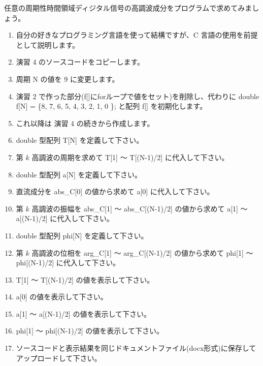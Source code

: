 \documentclass[a4paper]{jarticle}
\begin{document}
 任意の周期性時間領域ディジタル信号の高調波成分をプログラムで求めてみましょう。 \par
\par\vspace{1zh}
\begin{enumerate}
\item 自分の好きなプログラミング言語を使って結構ですが、C 言語の使用を前提として説明します。
\item 演習 4 のソースコードをコピーします。
\item 周期 N の値を 9 に変更します。
\item 演習 2 で作った部分(f[]にforループで値をセット)を削除し、代わりに double f[N] = \{8, 7, 6, 5, 4, 3, 2, 1, 0 \}; と配列 f[] を初期化します。
\item これ以降は 演習 4 の続きから作成します。
\item double 型配列 T[N] を定義して下さい。
\item 第 $k$ 高調波の周期を求めて T[1] 〜 T[(N-1)/2] に代入して下さい。
\item double 型配列 a[N] を定義して下さい。
\item 直流成分を abs\_C[0] の値から求めて a[0] に代入して下さい。
\item 第 $k$ 高調波の振幅を abs\_C[1] 〜  abs\_C[(N-1)/2] の値から求めて a[1] 〜 a[(N-1)/2] に代入して下さい。
\item double 型配列 phi[N] を定義して下さい。
\item 第 $k$ 高調波の位相を arg\_C[1] 〜 arg\_C[(N-1)/2] の値から求めて phi[1] 〜 phi[(N-1)/2] に代入して下さい。
\item T[1] 〜 T[(N-1)/2] の値を表示して下さい。
\item a[0] の値を表示して下さい。
\item a[1] 〜 a[(N-1)/2] の値を表示して下さい。
\item phi[1] 〜 phi[(N-1)/2] の値を表示して下さい。
\item ソースコードと表示結果を同じドキュメントファイル(docx形式)に保存してアップロードして下さい。
\end{enumerate}
\end{document}

